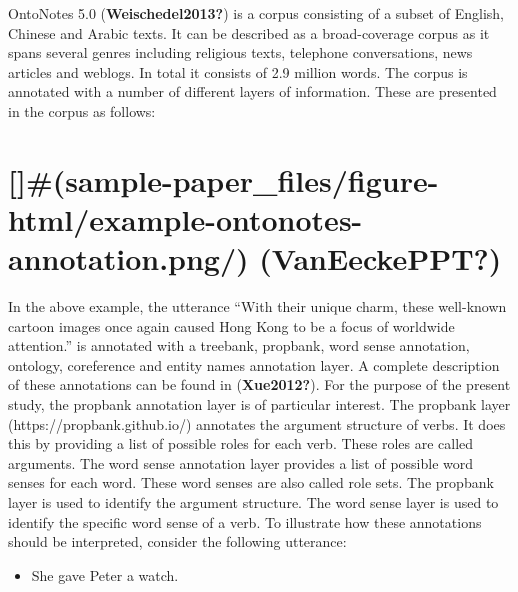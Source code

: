 \documentclass[
  letterpaper,
  DIV=11,
  numbers=noendperiod]{scrartcl}
\providecommand{\tightlist}{%
  \setlength{\itemsep}{0pt}\setlength{\parskip}{0pt}}\usepackage{longtable,booktabs,array}
\begin{document}
OntoNotes 5.0 (\textbf{Weischedel2013?}) is a corpus consisting of a
subset of English, Chinese and Arabic texts. It can be described as a
broad-coverage corpus as it spans several genres including religious
texts, telephone conversations, news articles and weblogs. In total it
consists of 2.9 million words. The corpus is annotated with a number of
different layers of information. These are presented in the corpus as
follows:

\hypertarget{sample-paper_filesfigure-htmlexample-ontonotes-annotation.png-vaneeckeppt}{%
\section{\texorpdfstring{{[}{]}\#(sample-paper\_files/figure-html/example-ontonotes-annotation.png/)
(\textbf{VanEeckePPT?})}{{[}{]}\#(sample-paper\_files/figure-html/example-ontonotes-annotation.png/) (VanEeckePPT?)}}\label{sample-paper_filesfigure-htmlexample-ontonotes-annotation.png-vaneeckeppt}}

In the above example, the utterance ``With their unique charm, these
well-known cartoon images once again caused Hong Kong to be a focus of
worldwide attention.'' is annotated with a treebank, propbank, word
sense annotation, ontology, coreference and entity names annotation
layer. A complete description of these annotations can be found in
(\textbf{Xue2012?}). For the purpose of the present study, the propbank
annotation layer is of particular interest. The propbank layer
(https://propbank.github.io/) annotates the argument structure of verbs.
It does this by providing a list of possible roles for each verb. These
roles are called arguments. The word sense annotation layer provides a
list of possible word senses for each word. These word senses are also
called role sets. The propbank layer is used to identify the argument
structure. The word sense layer is used to identify the specific word
sense of a verb. To illustrate how these annotations should be
interpreted, consider the following utterance:

\begin{itemize}
\tightlist
\item
  She gave Peter a watch.
\end{itemize}
\end{document}
